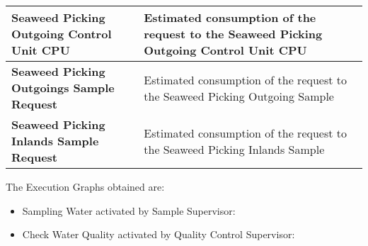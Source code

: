 \begin{longtable}{|p{6cm}|p{9cm}|}
\hline
\textbf{Seaweed Picking Outgoing Control Unit CPU} & Estimated 															   consumption of 											   			   the request to the 													   Seaweed Picking 														   Outgoing Control 													   Unit CPU\\

\hline
\textbf{Seaweed Picking Outgoings Sample Request} & Estimated 															   consumption of 											   			   the request to the 													   Seaweed Picking 														   Outgoing Sample \\

\hline
\textbf{Seaweed Picking Inlands Sample Request} & Estimated 															  consumption of 											   			  the request to the 													  Seaweed Picking 														  Inlands Sample \\
\hline
\end{longtable}

\newpage

The Execution Graphs obtained are:

\begin{itemize}
\item Sampling Water activated by Sample Supervisor:
	\bigskip
	\bigskip
	\begin{center}
	\end{center}
	\bigskip
\newpage
\item Check Water Quality activated by Quality Control Supervisor:
	\bigskip
	\bigskip
	\bigskip
	\bigskip
	\begin{center}
	\end{center}
	\bigskip
\end{itemize}



